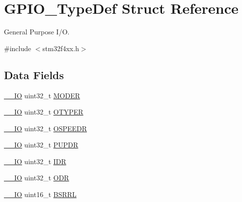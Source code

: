 \hypertarget{struct_g_p_i_o___type_def}{\section{G\-P\-I\-O\-\_\-\-Type\-Def Struct Reference}
\label{struct_g_p_i_o___type_def}
}


General Purpose I/\-O.  




{\ttfamily \#include $<$stm32f4xx.\-h$>$}

\subsection*{Data Fields}
\begin{DoxyCompactItemize}
\item 
\hyperlink{group___c_m_s_i_s__core__definitions_gaec43007d9998a0a0e01faede4133d6be}{\-\_\-\-\_\-\-I\-O} uint32\-\_\-t \hyperlink{struct_g_p_i_o___type_def_a2b671a94c63a612f81e0e9de8152d01c}{M\-O\-D\-E\-R}
\item 
\hyperlink{group___c_m_s_i_s__core__definitions_gaec43007d9998a0a0e01faede4133d6be}{\-\_\-\-\_\-\-I\-O} uint32\-\_\-t \hyperlink{struct_g_p_i_o___type_def_a9543592bda60cb5261075594bdeedac9}{O\-T\-Y\-P\-E\-R}
\item 
\hyperlink{group___c_m_s_i_s__core__definitions_gaec43007d9998a0a0e01faede4133d6be}{\-\_\-\-\_\-\-I\-O} uint32\-\_\-t \hyperlink{struct_g_p_i_o___type_def_a328d16cc6213783ede54e4059ffd50a3}{O\-S\-P\-E\-E\-D\-R}
\item 
\hyperlink{group___c_m_s_i_s__core__definitions_gaec43007d9998a0a0e01faede4133d6be}{\-\_\-\-\_\-\-I\-O} uint32\-\_\-t \hyperlink{struct_g_p_i_o___type_def_abeed38529bd7b8de082e490e5d4f1727}{P\-U\-P\-D\-R}
\item 
\hyperlink{group___c_m_s_i_s__core__definitions_gaec43007d9998a0a0e01faede4133d6be}{\-\_\-\-\_\-\-I\-O} uint32\-\_\-t \hyperlink{struct_g_p_i_o___type_def_a328d2fe9ef1d513c3a97d30f98f0047c}{I\-D\-R}
\item 
\hyperlink{group___c_m_s_i_s__core__definitions_gaec43007d9998a0a0e01faede4133d6be}{\-\_\-\-\_\-\-I\-O} uint32\-\_\-t \hyperlink{struct_g_p_i_o___type_def_abff7fffd2b5a718715a130006590c75c}{O\-D\-R}
\item 
\hyperlink{group___c_m_s_i_s__core__definitions_gaec43007d9998a0a0e01faede4133d6be}{\-\_\-\-\_\-\-I\-O} uint16\-\_\-t \hyperlink{struct_g_p_i_o___type_def_aa79204c9bcc8c481da0a5ffe7c74d8b0}{B\-S\-R\-R\-L}

\end{DoxyCompactItemize}
